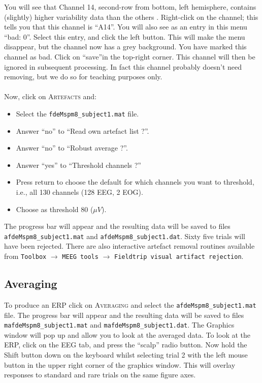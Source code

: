  You will see that Channel 14, second-row from bottom, left hemisphere, contains (slightly) higher variability data than the others .
Right-click on the channel; this tells you that this channel is ``A14''. You will also see as an entry in this menu ``bad: 0''. Select this entry, and click the left button. This will make the menu disappear, but the channel now has a grey background. You have marked this channel as bad. Click on ``save''in the top-right corner. This channel will then be ignored in subsequent processing. In fact this channel probably doesn't need removing, but we do so for teaching purposes only.
\\
\\
Now, click on \textsc{Artefacts} and:
\begin{itemize}
\item{Select the \texttt{fdeMspm8\_subject1.mat} file.}
\item{Answer ``no'' to ``Read own artefact list ?''.}
\item{Answer ``no'' to ``Robust average ?''.}
\item{Answer ``yes'' to ``Threshold channels ?''}
\item{Press return to choose the default for which channels you want to threshold, i.e., all 130 channels (128 EEG, 2 EOG). }
\item{Choose as threshold 80 ($\mu V$).}
\end{itemize}
The progress bar will appear and the resulting data will be saved to files \texttt{afdeMspm8\_subject1.mat} and \texttt{afdeMspm8\_subject1.dat}. Sixty five trials will have been rejected. There are also interactive artefact removal routines available from \texttt{Toolbox} $\rightarrow$ \texttt{MEEG tools} $\rightarrow$  \texttt{Fieldtrip visual artifact rejection}.

\subsection{Averaging}
To produce an ERP click on \textsc{Averaging} and select the \texttt{afdeMspm8\_subject1.mat} file. The progress bar will appear and the resulting data will be saved to files \texttt{mafdeMspm8\_subject1.mat} and \texttt{mafdeMspm8\_subject1.dat}. The Graphics window will pop up and allow you to look at the averaged data. To look at the ERP, click on the EEG tab, and press the ``scalp'' radio button. Now hold  the Shift button down on the keyboard whilst selecting trial 2 with the left mouse button in the upper right corner of the graphics window. This will overlay responses to standard and rare trials on the same figure axes.

